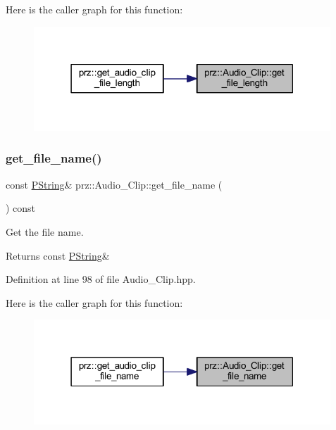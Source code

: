 Here is the caller graph for this function\+:
\nopagebreak
\begin{figure}[H]
\begin{center}
\leavevmode
\includegraphics[width=316pt]{classprz_1_1_audio___clip_aa64143bed59cae5e2809284ad5765b52_icgraph}
\end{center}
\end{figure}
\mbox{\label{classprz_1_1_audio___clip_a548005698eae9ec6499fe1f02f69ecf1}} 
\subsubsection{\texorpdfstring{get\_file\_name()}{get\_file\_name()}}
{\footnotesize\ttfamily const \mbox{\hyperlink{classprz_1_1_p_string}{P\+String}}\& prz\+::\+Audio\+\_\+\+Clip\+::get\+\_\+file\+\_\+name (\begin{DoxyParamCaption}{ }\end{DoxyParamCaption}) const\hspace{0.3cm}{\ttfamily [inline]}}



Get the file name. 

\begin{DoxyReturn}{Returns}
const \mbox{\hyperlink{classprz_1_1_p_string}{P\+String}}\& 
\end{DoxyReturn}


Definition at line 98 of file Audio\+\_\+\+Clip.\+hpp.

Here is the caller graph for this function\+:
\nopagebreak
\begin{figure}[H]
\begin{center}
\leavevmode
\includegraphics[width=316pt]{classprz_1_1_audio___clip_a548005698eae9ec6499fe1f02f69ecf1_icgraph}
\end{center}
\end{figure}
\mbox{\label{classprz_1_1_audio___clip_a06d95e1ba1b854e8f00b2ec3602d3c5f}} 
